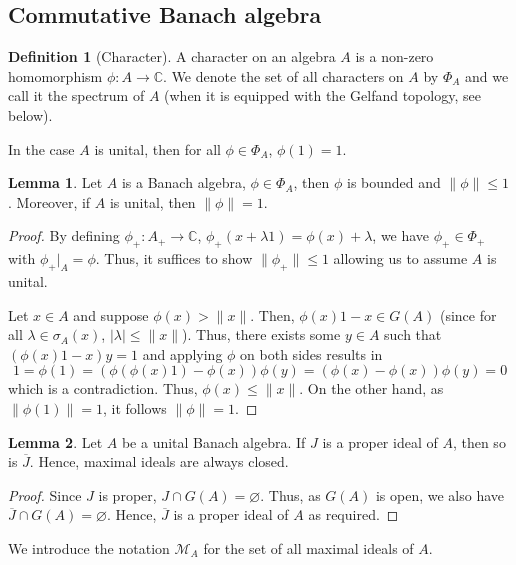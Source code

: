 \documentclass[]{article}
\theoremstyle{definition}
\newtheorem{definition}{Definition}[section]
\newtheorem{lemma}{Lemma}[section]
\begin{document}
\subsection{Commutative Banach algebra}

\begin{definition}[Character]
  A character on an algebra \(A\) is a non-zero homomorphism \(\phi : A \to \mathbb{C}\). We denote the 
  set of all characters on \(A\) by \(\Phi_A\) and we call it the spectrum of \(A\) (when it is 
  equipped with the Gelfand topology, see below).
\end{definition}

In the case \(A\) is unital, then for all \(\phi \in \Phi_A\), \(\phi(1) = 1\).

\begin{lemma}
  Let \(A\) is a Banach algebra, \(\phi \in \Phi_A\), then \(\phi\) is bounded and \(\|\phi\| \le 1\).
  Moreover, if \(A\) is unital, then \(\|\phi\| = 1\).
\end{lemma}
\begin{proof}
  By defining \(\phi_+ : A_+ \to \mathbb{C}\), \(\phi_+(x + \lambda 1) = \phi(x) + \lambda\), we have 
  \(\phi_+ \in \Phi_+\) with \(\phi_+|_{A} = \phi\). Thus, it suffices to show \(\|\phi_+\| \le 1\) 
  allowing us to assume \(A\) is unital. 

  Let \(x \in A\) and suppose \(\phi(x) > \|x\|\). Then, \(\phi(x)1 - x \in G(A)\) 
  (since for all \(\lambda \in \sigma_A(x)\), \(|\lambda| \le \|x\|\)). Thus, there exists some \(y \in A\) 
  such that \((\phi(x)1 - x)y = 1\) and applying \(\phi\) on both sides results in
  \[1 = \phi(1) = (\phi(\phi(x) 1) - \phi(x))\phi(y) = (\phi(x) - \phi(x))\phi(y) = 0\]
  which is a contradiction. Thus, \(\phi(x) \le \|x\|\). On the other hand, as \(\|\phi(1)\| = 1\), 
  it follows \(\|\phi\| = 1\).
\end{proof}

\begin{lemma}
  Let \(A\) be a unital Banach algebra. If \(J\) is a proper ideal of \(A\), then so is \(\overline{J}\). 
  Hence, maximal ideals are always closed.
\end{lemma}
\begin{proof}
  Since \(J\) is proper, \(J \cap G(A) = \varnothing\). Thus, as \(G(A)\) is open, we also have 
  \(\overline{J} \cap G(A) = \varnothing\). Hence, \(\overline{J}\) is a proper ideal of \(A\) 
  as required.
\end{proof}

We introduce the notation \(\mathcal{M}_A\) for the set of all maximal ideals of \(A\).
\end{document}
